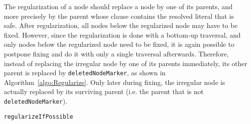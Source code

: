 The regularization of a node should replace a node by one of its parents, and more precisely by the parent whose clause contains the resolved literal that is safe. After regularization, all nodes below the regularized node may have to be fixed. However, since the regularization is done with a bottom-up traversal, and only nodes below the regularized node need to be fixed, it is again possible to postpone fixing and do it with only a single traversal afterwards. 
Therefore, instead of replacing the irregular node by one of its parents immediately, 
its other parent is replaced by \texttt{deletedNodeMarker}, as shown in Algorithm~\ref{algo:Regularize}. Only later during fixing, 
the irregular node is actually replaced by its surviving parent (i.e. the parent that is not \texttt{deletedNodeMarker}).



\begin{algorithm}[t]
\begin{footnotesize}



\BlankLine
\caption{\label{algo:Regularize} \texttt{regularizeIfPossible}}
\end{footnotesize}
\end{algorithm}


